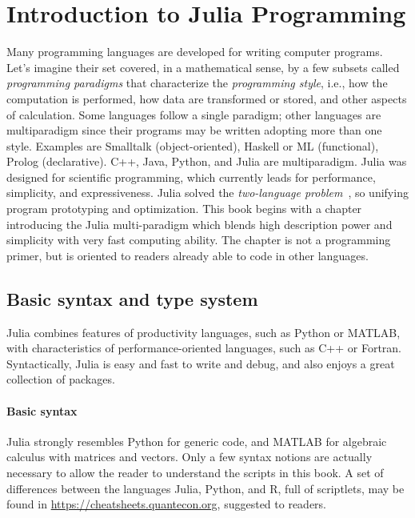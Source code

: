 
\chapter{Introduction to Julia Programming}\label{chapt:}

Many programming languages are developed for writing computer programs. Let’s imagine their set covered, in a mathematical sense, by a few subsets called \emph{programming paradigms} that characterize the \emph{programming style}, i.e., how the computation is performed, how data are transformed or stored, and other aspects of calculation.
Some languages follow a single paradigm; other languages are multiparadigm since their programs may be written adopting more than one style. Examples are Smalltalk (object-oriented), Haskell or ML (functional), Prolog (declarative).  C++, Java, Python, and Julia are multiparadigm. 
Julia was designed for scientific programming, which currently leads for performance, simplicity, and expressiveness. Julia solved the \emph{two-language problem}~\cite{BEKS14}, so unifying program prototyping and optimization.
This book begins with a chapter introducing the Julia multi-paradigm which blends high description power and simplicity with very fast computing ability. The chapter is not a programming primer, but is oriented to readers already able to code in other languages.



\section{Basic syntax and type system}\label{sect:1-1}

Julia combines features of productivity languages, such as Python or MATLAB, with characteristics of performance-oriented languages, such as C++ or Fortran. Syntactically, Julia is easy and fast to write and debug, and also enjoys a great collection of packages.

\subsubsection*{Basic syntax}

Julia strongly resembles Python for generic code, and MATLAB for algebraic calculus with matrices and vectors. 
Only a few syntax notions are actually necessary to allow the reader to understand the scripts in this book.
A set of differences between the languages Julia, Python, and R, full of scriptlets, may be found in \href{https://cheatsheets.quantecon.org}{https://cheatsheets.quantecon.org}, suggested to readers.

